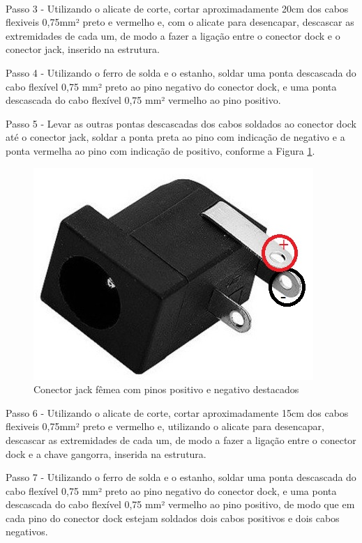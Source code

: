 \paragraph{} Passo 3 - Utilizando o alicate de corte, cortar aproximadamente 20cm dos cabos flexiveis 0,75mm² preto e vermelho e, com o alicate para desencapar, descascar as extremidades de cada um, de modo a fazer a ligação entre o conector dock e o conector jack, inserido na estrutura.

Passo 4 - Utilizando o ferro de solda e o estanho, soldar uma ponta descascada do cabo flexível 0,75 mm² preto ao pino negativo do conector dock, e uma ponta descascada do cabo flexível 0,75 mm² vermelho ao pino positivo.

Passo 5 - Levar as outras pontas descascadas dos cabos soldados ao conector dock até o conector jack, soldar a ponta preta ao pino com indicação de negativo e a ponta vermelha ao pino com indicação de positivo, conforme a Figura \ref{fig:jackfemea}.

\begin{figure}[H]
  \centering
  \includegraphics[keepaspectratio=true,scale=0.5] {Figuras/MALETA/energiamaleta/jackfemea.jpg}
  \caption{Conector jack fêmea com pinos positivo e negativo destacados} 
  \label{fig:jackfemea}
\end{figure}

Passo 6 - Utilizando o alicate de corte, cortar aproximadamente 15cm dos cabos flexiveis 0,75mm² preto e vermelho e, utilizando o alicate para desencapar, descascar as extremidades de cada um, de modo a fazer a ligação entre o conector dock e a chave gangorra, inserida na estrutura.

Passo 7 - Utilizando o ferro de solda e o estanho, soldar uma ponta descascada do cabo flexível 0,75 mm² preto ao pino negativo do conector dock, e uma ponta descascada do cabo flexível 0,75 mm² vermelho ao pino positivo, de modo que em cada pino do conector dock estejam soldados dois cabos positivos e dois cabos negativos.

